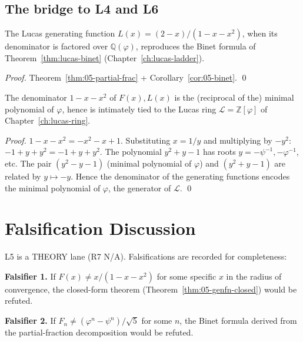 \subsection{The bridge to L4 and L6}

\begin{theorem}
\label{thm:05-bridge-to-l4}
The Lucas generating function $L(x) = (2-x)/(1-x-x^2)$, when its
denominator is factored over $\mathbb{Q}(\varphi)$, reproduces the
Binet formula of Theorem~\ref{thm:lucas-binet} (Chapter~\ref{ch:lucas-ladder}).
\end{theorem}

\begin{proof}
Theorem~\ref{thm:05-partial-frac} + Corollary~\ref{cor:05-binet}. \qed
\end{proof}

\begin{theorem}
\label{thm:05-bridge-to-l6}
The denominator $1 - x - x^2$ of $F(x), L(x)$ is the (reciprocal of the)
minimal polynomial of $\varphi$, hence is intimately tied to the Lucas
ring $\mathcal{L} = \mathbb{Z}[\varphi]$ of Chapter~\ref{ch:lucas-ring}.
\end{theorem}

\begin{proof}
$1 - x - x^2 = -x^2 - x + 1$. Substituting $x = 1/y$ and multiplying by
$-y^2$: $-1 + y + y^2 = -1 + y + y^2$. The polynomial $y^2 + y - 1$ has
roots $y = -\psi^{-1}, -\varphi^{-1}$, etc. The pair $(y^2 - y - 1)$
(minimal polynomial of $\varphi$) and $(y^2 + y - 1)$ are related by
$y \mapsto -y$. Hence the denominator of the generating functions
encodes the minimal polynomial of $\varphi$, the generator of
$\mathcal{L}$. \qed
\end{proof}

\section{Falsification Discussion}
\label{sec:05-falsification}

L5 is a THEORY lane (R7 N/A). Falsifications are recorded for
completeness:

\textbf{Falsifier 1.} If $F(x) \ne x/(1-x-x^2)$ for some specific $x$
in the radius of convergence, the closed-form theorem
(Theorem~\ref{thm:05-genfn-closed}) would be refuted.

\textbf{Falsifier 2.} If $F_n \ne (\varphi^n - \psi^n)/\sqrt{5}$ for some
$n$, the Binet formula derived from the partial-fraction decomposition
would be refuted.


